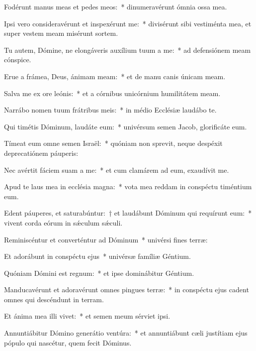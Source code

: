 \item Fodérunt manus meas et pedes meos:~* dinumeravérunt ómnia ossa mea.

\item Ipsi vero consideravérunt et inspexérunt me:~* divisérunt sibi vestiménta mea, et super vestem meam misérunt sortem.

\item Tu autem, Dómine, ne elongáveris auxílium tuum a me:~* ad defensiónem meam cónspice.

\item Erue a frámea, Deus, ánimam meam:~* et de manu canis únicam meam.

\item Salva me ex ore leónis:~* et a córnibus unicórnium humilitátem meam.

\item Narrábo nomen tuum frátribus meis:~* in médio Ecclésiæ laudábo te.

\item Qui timétis Dóminum, laudáte eum:~* univérsum semen Jacob, glorificáte eum.

\item Tímeat eum omne semen Israël:~* quóniam non sprevit, neque despéxit deprecatiónem páuperis:

\item Nec avértit fáciem suam a me:~* et cum clamárem ad eum, exaudívit me.

\item Apud te laus mea in ecclésia magna:~* vota mea reddam in conspéctu timéntium eum.

\item Edent páuperes, et saturabúntur:~† et laudábunt Dóminum qui requírunt eum:~* vivent corda eórum in sǽculum sǽculi.

\item Reminiscéntur et converténtur ad Dóminum~* univérsi fines terræ:

\item Et adorábunt in conspéctu ejus~* univérsæ famíliæ Géntium.

\item Quóniam Dómini est regnum:~* et ipse dominábitur Géntium.

\item Manducavérunt et adoravérunt omnes pingues terræ:~* in conspéctu ejus cadent omnes qui descéndunt in terram.

\item Et ánima mea illi vivet:~* et semen meum sérviet ipsi.

\item Annuntiábitur Dómino generátio ventúra:~* et annuntiábunt cæli justítiam ejus pópulo qui nascétur, quem fecit Dóminus.

